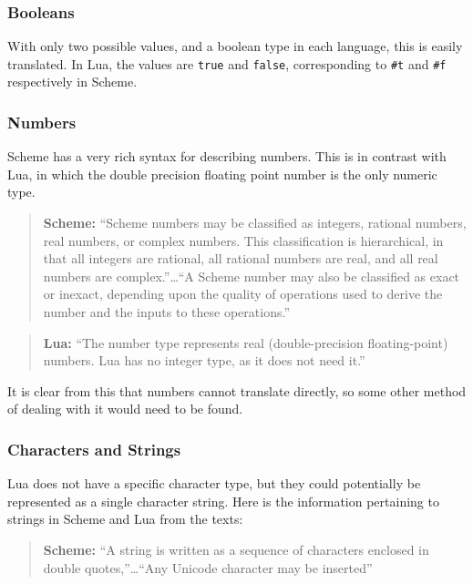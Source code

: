 \subsubsection{Booleans}

With only two possible values, and a boolean type in each language, this is
easily translated. In Lua, the values are \texttt{true} and \texttt{false},
corresponding to \texttt{\#t} and \texttt{\#f} respectively in Scheme.

\subsubsection{Numbers}

Scheme has a very rich syntax for describing numbers. This is in contrast with
Lua, in which the double precision floating point number is the only
numeric type.

\begin{quotation}\textbf{Scheme:}
``Scheme numbers may be classified as integers, rational numbers, real numbers,
or complex numbers. This classification is hierarchical, in that all integers
are rational, all rational numbers are real, and all real numbers are
complex.''\ldots ``A Scheme number may also be classified as exact or inexact,
depending upon the quality of operations used to derive the number and the
inputs to these operations.''~\cite[Sec~6.4]{tspl}
\end{quotation}

\begin{quotation}\textbf{Lua:}
``The number type represents real (double-precision floating-point) numbers. Lua
has no integer type, as it does not need it.''~\cite[p.10]{luabook}
\end{quotation}

It is clear from this that numbers cannot translate directly, so some other
method of dealing with it would need to be found.

\subsubsection{Characters and Strings}

Lua does not have a specific character type, but they could potentially be
represented as a single character string. Here is the information pertaining to
strings in Scheme and Lua from the texts:

\begin{quotation}\textbf{Scheme:}
``A string is written as a sequence of characters enclosed in double
quotes,''\ldots ``Any Unicode character may be inserted''~\cite[Sec~6.8]{tspl}
\end{quotation}

